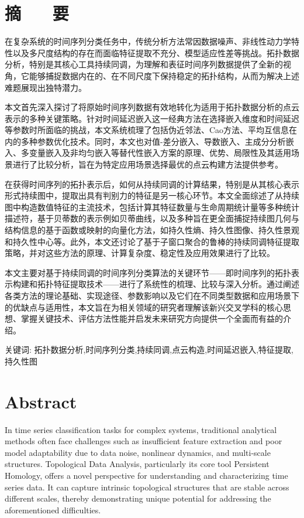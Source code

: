 \section*{ \centering 摘 ~~ 要}
在复杂系统的时间序列分类任务中，传统分析方法常因数据噪声、非线性动力学特性以及多尺度结构的存在而面临特征提取不充分、模型适应性差等挑战。拓扑数据分析，特别是其核心工具持续同调，为理解和表征时间序列数据提供了全新的视角，它能够捕捉数据内在的、在不同尺度下保持稳定的拓扑结构，从而为解决上述难题展现出独特潜力。

本文首先深入探讨了将原始时间序列数据有效地转化为适用于拓扑数据分析的点云表示的多种关键策略。针对时间延迟嵌入这一经典方法在选择嵌入维度和时间延迟等参数时所面临的挑战，本文系统梳理了包括伪近邻法、Cao方法、平均互信息在内的多种参数优化技术。同时，本文也对值-差分嵌入、导数嵌入、主成分分析嵌入、多变量嵌入及非均匀嵌入等替代性嵌入方案的原理、优势、局限性及其适用场景进行了比较分析，旨在为特定应用场景选择最优的点云构建方法提供参考。

在获得时间序列的拓扑表示后，如何从持续同调的计算结果，特别是从其核心表示形式持续图中，提取出具有判别力的特征是另一核心环节。本文全面综述了从持续图中构造数值特征的主流技术，包括计算其特征数量与生命周期统计量等多种统计描述符，基于贝蒂数的表示例如贝蒂曲线，以及多种旨在更全面捕捉持续图几何与结构信息的基于函数或映射的向量化方法，如持久性熵、持久性图像、持久性景观和持久性中心等。此外，本文还讨论了基于子窗口聚合的鲁棒的持续同调特征提取策略，并对这些方法的原理、计算复杂度、稳定性及应用效果进行了比较。

本文主要对基于持续同调的时间序列分类算法的关键环节——即时间序列的拓扑表示构建和拓扑特征提取技术——进行了系统性的梳理、比较与深入分析。通过阐述各类方法的理论基础、实现途径、参数影响以及它们在不同类型数据和应用场景下的优缺点与适用性，本文旨在为相关领域的研究者理解该新兴交叉学科的核心思想、掌握关键技术、评估方法性能并启发未来研究方向提供一个全面而有益的介绍。






\vskip0.5cm

{ \heiti 关键词: } 拓扑数据分析,时间序列分类,持续同调,点云构造,时间延迟嵌入,特征提取,持久性图

\clearpage
\section*{ \centering \textbf{Abstract} }

In time series classification tasks for complex systems, traditional analytical methods often face challenges such as insufficient feature extraction and poor model adaptability due to data noise, nonlinear dynamics, and multi-scale structures. Topological Data Analysis, particularly its core tool Persistent Homology, offers a novel perspective for understanding and characterizing time series data. It can capture intrinsic topological structures that are stable across different scales, thereby demonstrating unique potential for addressing the aforementioned difficulties.

